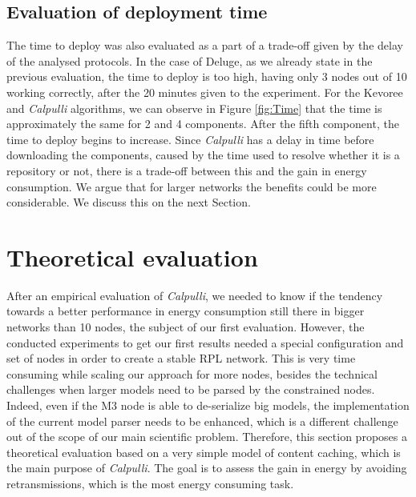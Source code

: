 \subsection{Evaluation of deployment time}

The time to deploy was also evaluated as a part of a trade-off given by the delay of the analysed protocols.
In the case of Deluge, as we already state in the previous evaluation, the time to deploy is too high, having only 3 nodes out of 10 working correctly, after the 20 minutes given to the experiment.
For the Kevoree and \textit{Calpulli} algorithms, we can observe in Figure \ref{fig:Time} that the time is approximately the same for 2 and 4 components.
After the fifth component, the time to deploy begins to increase. Since \textit{Calpulli} has a delay in time before downloading the components, caused by the time used to resolve whether it is a repository or not, there is a trade-off between this and the gain in energy consumption. We argue that for larger networks the benefits could be more considerable. We discuss this on the next Section.

\section{Theoretical evaluation}
After an empirical evaluation of \textit{Calpulli}, we needed to know if the tendency towards a better performance in energy consumption still there in bigger networks than 10 nodes, the subject of our first evaluation.
However, the conducted experiments to get our first results needed a special configuration and set of nodes in order to create a stable RPL network.
This is very time consuming while scaling our approach for more nodes, besides the technical challenges when larger models need to be parsed by the constrained nodes.
Indeed, even if the M3 node is able to de-serialize big models, the implementation of the current model parser needs to be enhanced, which is a different challenge out of the scope of our main scientific problem.
Therefore, this section proposes a theoretical evaluation based on a very simple model of content caching, which is the main purpose of \textit{Calpulli}.
The goal is to assess the gain in energy by avoiding retransmissions, which is the most energy consuming task.

